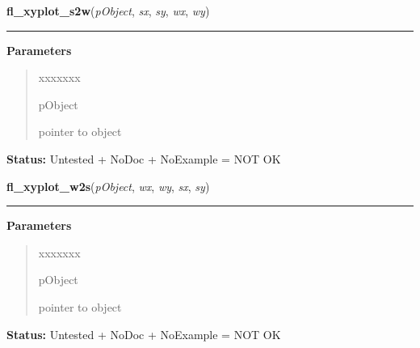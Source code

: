 \hspace{.8\funcindent}\begin{boxedminipage}{\funcwidth}

    \raggedright \textbf{fl\_xyplot\_s2w}(\textit{pObject}, \textit{sx}, \textit{sy}, \textit{wx}, \textit{wy})

    \vspace{-1.5ex}

    \rule{\textwidth}{0.5\fboxrule}
\setlength{\parskip}{2ex}
\setlength{\parskip}{1ex}
      \textbf{Parameters}
      \vspace{-1ex}

      \begin{quote}
        \begin{Ventry}{xxxxxxx}

          \item[pObject]

          pointer to object

        \end{Ventry}

      \end{quote}

\textbf{Status:} Untested + NoDoc + NoExample = NOT OK



    \end{boxedminipage}

    \label{xformslib:library:fl_xyplot_w2s}

    \vspace{0.5ex}

\hspace{.8\funcindent}\begin{boxedminipage}{\funcwidth}

    \raggedright \textbf{fl\_xyplot\_w2s}(\textit{pObject}, \textit{wx}, \textit{wy}, \textit{sx}, \textit{sy})

    \vspace{-1.5ex}

    \rule{\textwidth}{0.5\fboxrule}
\setlength{\parskip}{2ex}
\setlength{\parskip}{1ex}
      \textbf{Parameters}
      \vspace{-1ex}

      \begin{quote}
        \begin{Ventry}{xxxxxxx}

          \item[pObject]

          pointer to object

        \end{Ventry}

      \end{quote}

\textbf{Status:} Untested + NoDoc + NoExample = NOT OK



    \end{boxedminipage}

